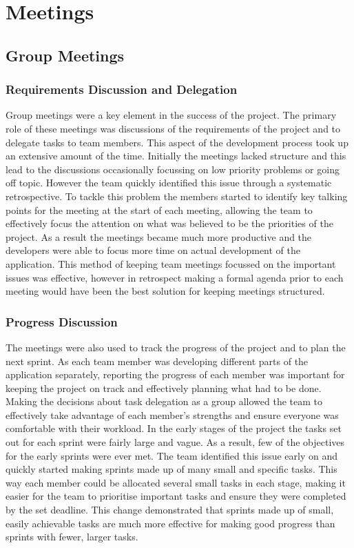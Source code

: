 \documentclass{l3proj}
\begin{document}
\section{Meetings}
\label{sec:meetings}

\subsection{Group Meetings}
\subsubsection{Requirements Discussion and Delegation}
Group meetings were a key element in the success of the project. The primary role of these meetings was discussions of the requirements of the project and to delegate tasks to team members. This aspect of the development process took up an extensive amount of the time. Initially the meetings lacked structure and this lead to the discussions occasionally focussing on low priority problems or going off topic. However the team quickly identified this issue through a systematic retrospective. To tackle this problem the members started to identify key talking points for the meeting at the start of each meeting, allowing the team to effectively focus the attention on what was believed to be the priorities of the project. As a result the meetings became much more productive and the developers were able to focus more time on actual development of the application. This method of keeping team meetings focussed on the important issues was effective, however in retrospect making a formal agenda prior to each meeting would have been the best solution for keeping meetings structured.

\subsubsection{Progress Discussion}
The meetings were also used to track the progress of the project and to plan the next sprint. As each team member was developing different parts of the application separately, reporting the progress of each member was important for keeping the project on track and effectively planning what had to be done. Making the decisions about task delegation as a group allowed the team to effectively take advantage of each member's strengths and ensure everyone was comfortable with their workload. In the early stages of the project the tasks set out for each sprint were fairly large and vague. As a result, few of the objectives for the early sprints were ever met. The team identified this issue early on and quickly started making sprints made up of many small and specific tasks. This way each member could be allocated several small tasks in each stage, making it easier for the team to prioritise important tasks and ensure they were completed by the set deadline. This change demonstrated that sprints made up of small, easily achievable tasks are much more effective for making good progress than sprints with fewer, larger tasks.
\end{document}
